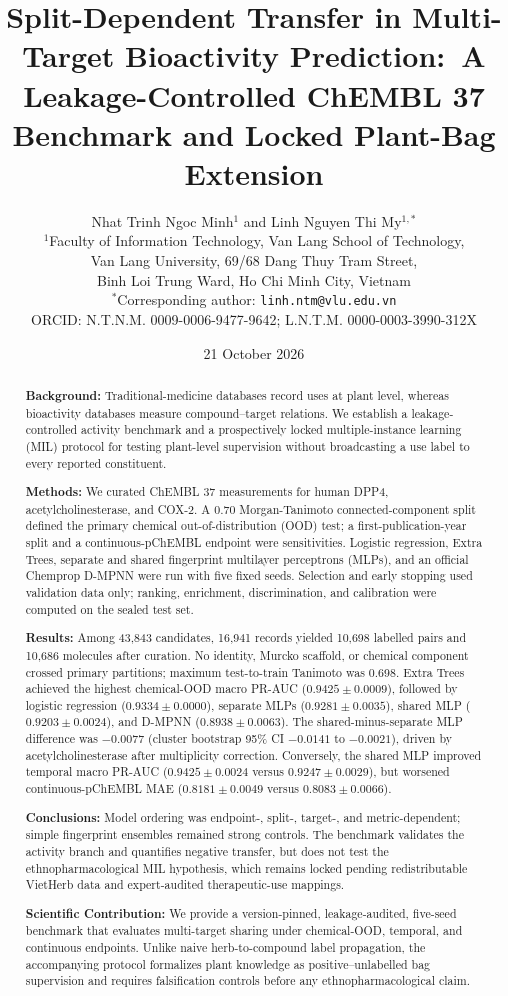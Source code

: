 \documentclass[11pt]{article}
\title{Split-Dependent Transfer in Multi-Target Bioactivity Prediction:\
A Leakage-Controlled ChEMBL 37 Benchmark and Locked Plant-Bag Extension}
\author{Nhat Trinh Ngoc Minh$^{1}$ and Linh Nguyen Thi My$^{1,*}$\\[2pt]
\small $^{1}$Faculty of Information Technology, Van Lang School of Technology,\\
\small Van Lang University, 69/68 Dang Thuy Tram Street,\\
\small Binh Loi Trung Ward, Ho Chi Minh City, Vietnam\\
\small $^{*}$Corresponding author: \texttt{linh.ntm@vlu.edu.vn}\\
\small ORCID: N.T.N.M. 0009-0006-9477-9642; L.N.T.M. 0000-0003-3990-312X}
\date{21 October 2026}
\begin{document}
\doublespacing
\linenumbers
\maketitle

\begin{abstract}
\textbf{Background:}
Traditional-medicine databases record uses at plant level, whereas bioactivity
databases measure compound--target relations. We establish a leakage-controlled
activity benchmark and a prospectively locked multiple-instance learning (MIL)
protocol for testing plant-level supervision without broadcasting a use label
to every reported constituent.

\textbf{Methods:}
We curated ChEMBL 37 measurements for human DPP4, acetylcholinesterase, and
COX-2. A 0.70 Morgan-Tanimoto connected-component split defined the primary
chemical out-of-distribution (OOD) test; a first-publication-year split and a
continuous-pChEMBL endpoint were sensitivities. Logistic regression, Extra
Trees, separate and shared fingerprint multilayer perceptrons (MLPs), and an
official Chemprop D-MPNN were run with five fixed seeds. Selection and early
stopping used validation data only; ranking, enrichment, discrimination, and
calibration were computed on the sealed test set.

\textbf{Results:}
Among 43,843 candidates, 16,941 records yielded 10,698 labelled pairs and
10,686 molecules after curation. No identity, Murcko scaffold, or chemical
component crossed primary partitions; maximum test-to-train Tanimoto was
0.698. Extra Trees achieved the highest chemical-OOD macro PR-AUC
($0.9425\pm0.0009$), followed by logistic regression
($0.9334\pm0.0000$), separate MLPs ($0.9281\pm0.0035$), shared MLP
($0.9203\pm0.0024$), and D-MPNN ($0.8938\pm0.0063$). The shared-minus-separate
MLP difference was $-0.0077$ (cluster bootstrap 95\% CI $-0.0141$ to
$-0.0021$), driven by acetylcholinesterase after multiplicity correction.
Conversely, the shared MLP improved temporal macro PR-AUC
($0.9425\pm0.0024$ versus $0.9247\pm0.0029$), but worsened continuous-pChEMBL
MAE ($0.8181\pm0.0049$ versus $0.8083\pm0.0066$).

\textbf{Conclusions:}
Model ordering was endpoint-, split-, target-, and metric-dependent; simple
fingerprint ensembles remained strong controls. The benchmark validates the
activity branch and quantifies negative transfer, but does not test the
ethnopharmacological MIL hypothesis, which remains locked pending redistributable
VietHerb data and expert-audited therapeutic-use mappings.

\textbf{Scientific Contribution:}
We provide a version-pinned, leakage-audited, five-seed benchmark that evaluates
multi-target sharing under chemical-OOD, temporal, and continuous endpoints.
Unlike naive herb-to-compound label propagation, the accompanying protocol
formalizes plant knowledge as positive--unlabelled bag supervision and requires
falsification controls before any ethnopharmacological claim.
\end{abstract}
\end{document}
